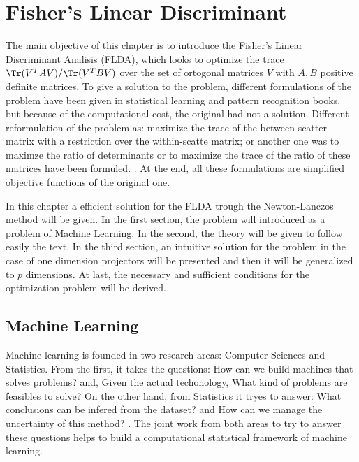 \chapter{Fisher's Linear Discriminant}
\label{ch:chapter2}
 
The main objective of this chapter is to introduce the Fisher's Linear Discriminant Analisis (FLDA), which looks to optimize the trace $\Tr(V^T A V) / \Tr(V^T B V)$ over the set of ortogonal matrices $V$ with $A, B$ positive definite matrices. To give a solution to the problem, different formulations of the problem have been given in statistical learning and pattern recognition books, but because of the computational cost, \cite{wang2007trace} \cite{ngo2012trace} the original had not a solution. Different reformulation of the problem as: maximize the trace of the between-scatter matrix with a restriction over the within-scatte matrix; or another one was to maximze the ratio of determinants or to maximize the trace of the ratio of these matrices have been formuled. \cite{duda2012pattern} \cite{hastie2009elements} \cite{mitchell2006discipline} \cite{fukunaga2013introduction}. At the end, all these formulations are simplified objective functions of the original one.

In this chapter a efficient solution for the FLDA trough the Newton-Lanczos method will be given. In the first section, the problem will introduced as a problem of Machine Learning. In the second, the theory will be given to follow easily the text. In the third section, an intuitive solution for the problem in the case of one dimension projectors will be presented and then it will be generalized to $p$ dimensions. At last, the necessary and sufficient conditions for the optimization problem will be derived.


\section{Machine Learning}
 
Machine learning is founded in two research areas: Computer Sciences and Statistics. From the first, it takes the questions: How can we build machines that solves problems? and, Given the actual techonology, What kind of problems are feasibles to solve? On the other hand, from Statistics it tryes to answer: What conclusions can be infered from the dataset? and How can we manage the uncertainty of this method? \cite{mitchell2006discipline}. The joint work from both areas to try to answer these questions helps to build a computational statistical framework of machine learning.

